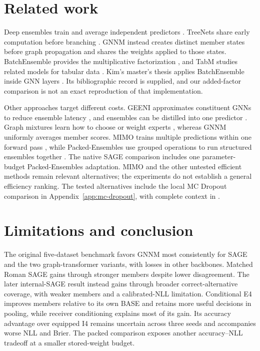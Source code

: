 \documentclass{article}
\begin{document}
\section{Related work}
Deep ensembles train and average independent predictors \citep{lakshminarayanan2017simple}. TreeNets share early computation before branching \citep{lee2015heads}. GNNM instead creates distinct member states before graph propagation and shares the weights applied to those states. BatchEnsemble provides the multiplicative factorization \citep{wen2020batchensemble}, and TabM studies related models for tabular data \citep{gorishniy2025tabm}. Kim's master's thesis applies BatchEnsemble inside GNN layers \citep{kim2023efficient}. Its bibliographic record is supplied, and our added-factor comparison is not an exact reproduction of that implementation.

Other approaches target different costs. GEENI approximates constituent GNNs to reduce ensemble latency \citep{nagarajan2022geeni}, and ensembles can be distilled into one predictor \citep{zhang2024e2gnn}. Graph mixtures learn how to choose or weight experts \citep{wang2023graph,deng2025mixture}, whereas GNNM uniformly averages member scores. MIMO trains multiple predictions within one forward pass \citep{havasi2021training}, while Packed-Ensembles use grouped operations to run structured ensembles together \citep{laurent2023packed}. The native SAGE comparison includes one parameter-budget Packed-Ensembles adaptation. MIMO and the other untested efficient methods remain relevant alternatives; the experiments do not establish a general efficiency ranking. The tested alternatives include the local MC Dropout comparison in Appendix~\ref{app:mc-dropout}, with complete context in .

\section{Limitations and conclusion}
The original five-dataset benchmark favors GNNM most consistently for SAGE and the two graph-transformer variants, with losses in other backbones. Matched Roman SAGE gains through stronger members despite lower disagreement. The later internal-SAGE result instead gains through broader correct-alternative coverage, with weaker members and a calibrated-NLL limitation. Conditional E4 improves members relative to its own BASE and retains more useful decisions in pooling, while receiver conditioning explains most of its gain. Its accuracy advantage over equipped I4 remains uncertain across three seeds and accompanies worse NLL and Brier. The packed comparison exposes another accuracy--NLL tradeoff at a smaller stored-weight budget.
\end{document}
